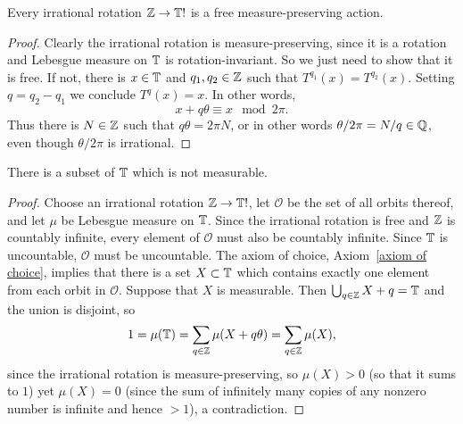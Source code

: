 \begin{lemma}
Every irrational rotation $\mathbb{Z} \to \mathbb{T}!$ is a free measure-preserving action.
\end{lemma}
\begin{proof}
Clearly the irrational rotation is measure-preserving, since it is a rotation and Lebesgue measure on $\mathbb{T}$ is rotation-invariant.
So we just need to show that it is free.
If not, there is $x \in \mathbb{T}$ and $q_1, q_2 \in \mathbb{Z}$ such that $T^{q_1}(x) = T^{q_2}(x)$.
Setting $q = q_2 - q_1$ we conclude $T^q(x) = x$.
In other words,
$$x + q\theta \equiv x \mod 2\pi.$$
Thus there is $N \in \mathbb{Z}$ such that $q\theta = 2\pi N$, or in other words $\theta/2\pi = N/q \in \mathbb{Q}$, even though $\theta/2\pi$ is irrational.
\end{proof}

\begin{theorem}[Vitali]\label{Vitali's set}
There is a subset of $\mathbb{T}$ which is not measurable.
\end{theorem}
\begin{proof}
Choose an irrational rotation $\mathbb{Z} \to \mathbb{T}!$, let $\mathcal O$ be the set of all orbits thereof, and let $\mu$ be Lebesgue measure on $\mathbb{T}$.
Since the irrational rotation is free and $\mathbb{Z}$ is countably infinite, every element of $\mathcal O$ must also be countably infinite.
Since $\mathbb{T}$ is uncountable, $\mathcal O$ must be uncountable.
The axiom of choice, Axiom~\ref{axiom of choice}, implies that there is a set $X \subset \mathbb{T}$ which contains exactly one element from each orbit in $\mathcal O$.
Suppose that $X$ is measurable. Then $\bigcup_{q \in \mathbb{Z}} X + q = \mathbb{T}$ and the union is disjoint, so
\[1 = \mu(\mathbb{T}) = \sum_{q \in \mathbb{Z}} \mu(X + q\theta) = \sum_{q \in \mathbb{Z}} \mu(X),\]
since the irrational rotation is measure-preserving, so $\mu(X) > 0$ (so that it sums to $1$) yet $\mu(X) = 0$ (since the sum of infinitely many copies of any nonzero number is infinite and hence $> 1$), a contradiction.
\end{proof}


